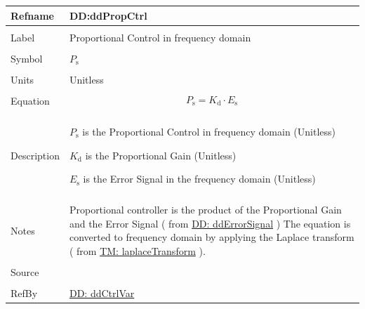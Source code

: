 \documentclass[12pt]{article}
\begin{document}
\vspace{\baselineskip}
\noindent
\begin{minipage}{\textwidth}
\begin{tabular}{>{\raggedright}p{}>{\raggedright\arraybackslash}p{}}
\toprule \textbf{Refname} & \textbf{DD:ddPropCtrl}
\label{DD:ddPropCtrl}
\\ \midrule \\
Label & Proportional Control in frequency domain
        
\\ \midrule \\
Symbol & ${P_{\text{s}}}$
         
\\ \midrule \\
Units & Unitless
        
\\ \midrule \\
Equation & \begin{displaymath}
           {P_{\text{s}}}={K_{\text{d}}}\cdot{}{E_{\text{s}}}
           \end{displaymath}
\\ \midrule \\
Description & \begin{symbDescription}
              \item{${P_{\text{s}}}$ is the Proportional Control in frequency domain (Unitless)}
              \item{${K_{\text{d}}}$ is the Proportional Gain (Unitless)}
              \item{${E_{\text{s}}}$ is the Error Signal in the frequency domain (Unitless)}
              \end{symbDescription}
\\ \midrule \\
Notes & Proportional controller is the product of the Proportional Gain and the Error Signal ( from  \hyperref[DD:ddErrorSignal]{DD: ddErrorSignal} ) The equation is converted to frequency domain by applying the Laplace transform ( from \hyperref[TM:laplaceTransform]{TM: laplaceTransform} ).
        
\\ \midrule \\
Source & \cite{johnson2008}
         
\\ \midrule \\
RefBy & \hyperref[DD:ddCtrlVar]{DD: ddCtrlVar}
        
\\ \bottomrule
\end{tabular}
\end{minipage}
\end{document}
